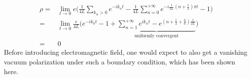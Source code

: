 \begin{equation*}
\begin{split}
\rho =& \lim_{t\rightarrow 0} e \bigg(\frac{1}{4L}\sum_{k_n>0} e^{-ik_nt} 
- \frac{ 1}{ 4L}\sum_{n=0}^{+\infty} e^{-i\frac{1}{2L}(n+\frac 1 2 ) \pi t} - 1 \bigg) \\
%
= & \lim_{t\rightarrow 0 }\frac{e}{4L}\Big( e^{-ik_0t} - 1 +
\underbrace{ \sum_{n=1}^{+\infty}e^{ik_nt} - e^{(n+\frac 1 2 + \frac b n )\frac{t}{2L}} }_{\textrm{uniformly convergent}}
\Big) \\
= & 0
\end{split}
\end{equation*}
Before introducing electromagnetic field, one would expect to also get a vanishing vacuum polarization under such a boundary condition, which has been shown here.














